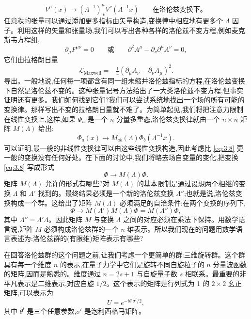 \begin{equation}
  V^\mu(x) \to (\Lambda^{-1})^{\mu}_{\ \nu}V^\nu(\Lambda^{-1}x)
  \qquad\text{在洛伦兹变换下。}
\end{equation}
任意秩的张量可以通过添加更多指标由矢量构造,变换律中相应地有更多个 $\Lambda$ 因子。利用这样的矢量和张量场,我们可以写出各种各样的洛伦兹不变方程,例如麦克斯韦方程组,
\begin{equation}
  \partial_\mu F^{\mu\nu} = 0
  \qquad\text{或}\qquad
  \partial^2 A^\mu - \partial_\nu\partial^\mu A^\nu = 0,
  \label{eq:3.6}
\end{equation}
它们由拉格朗日量
\begin{equation}
  \mathcal{L}_{\mathrm{Maxwell}} =
    -\tfrac{1}{4}(\partial_\mu A_\nu - \partial_\nu A_\mu)^2 .
  \label{eq:3.7}
\end{equation}
导出。一般地说,任何每一项都含有同一组未缩并洛伦兹指标的方程,在洛伦兹变换下自然是洛伦兹不变的。这种张量记号方法给出了一大类洛伦兹不变方程,但事实证明还有更多。我们如何找到它们?我们可以尝试系统地找出一个场的所有可能的变换律。那样写出不变的拉格朗日量就不难了。为简单起见,我们将把注意力限制在线性变换上,这样,如果 $\Phi_a$ 是一个 $n$ 分量多重态,洛伦兹变换律就由一个 $n\times n$ 矩阵 $M(\Lambda)$ 给出:
\begin{equation}
  \Phi_a(x) \to M_{ab}(\Lambda)\Phi_b(\Lambda^{-1}x).
  \label{eq:3.8}
\end{equation}
可以证明,最一般的非线性变换律可以由这些线性变换构造,因此考虑比 \eqref{eq:3.8} 更一般的变换没有任何好处。在下面的讨论中,我们将略去场自变量的变化,把变换 \eqref{eq:3.8} 写成形式
\begin{equation}
  \Phi \to M(\Lambda)\Phi .
  \label{eq:3.9}
\end{equation}
矩阵 $M(\Lambda)$ 允许的形式有哪些?对 $M(\Lambda)$ 的基本限制是通过设想两个相继的变换 $\Lambda$ 和 $\Lambda'$ 找到的。最终结果必须是一个新的洛伦兹变换 $\Lambda''$;也就是说,洛伦兹变换构成一个群。这给出了矩阵 $M(\Lambda)$ 必须满足的自洽条件:在两个变换的序列下,
\begin{equation}
  \Phi \to M(\Lambda')M(\Lambda)\Phi = M(\Lambda'')\Phi,
  \label{eq:3.10}
\end{equation}
其中 $\Lambda'' = \Lambda'\Lambda$。因此矩阵 $M$ 与变换 $\Lambda$ 之间的对应必须在乘法下保持。用数学语言说,矩阵 $M$ 必须构成洛伦兹群的一个 $n$ 维表示。所以我们现在的问题用数学语言表述为:洛伦兹群的(有限维)矩阵表示有哪些?

在回答洛伦兹群的这个问题之前,让我们考虑一个更简单的群:三维旋转群。这个群具有每一个维度 $n$ 的表示,在量子力学中它们是旋转不同自旋粒子的 $n$ 分量波函数的矩阵,因而是熟悉的。维度通过 $n = 2s+1$ 与自旋量子数 $s$ 相联系。最重要的非平凡表示是二维表示,对应自旋 $1/2$。这个表示的矩阵是行列式为 1 的 $2\times2$ 幺正矩阵,可以表示为
\begin{equation}
  U = e^{-i\theta^l\sigma^l/2},
  \label{eq:3.11}
\end{equation}
其中 $\theta^l$ 是三个任意参数,$\sigma^l$ 是泡利西格马矩阵。

